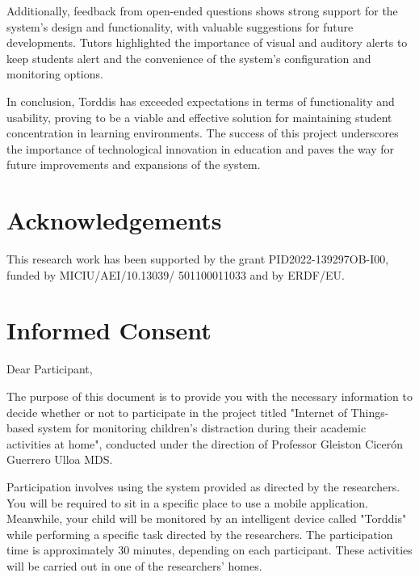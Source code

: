 \documentclass[a4paper,fleqn]{cas-sc}
\begin{document}
		Additionally, feedback from open-ended questions shows strong support for the system's design and functionality, with valuable suggestions for future developments. Tutors highlighted the importance of visual and auditory alerts to keep students alert and the convenience of the system's configuration and monitoring options.
		
		In conclusion, Torddis has exceeded expectations in terms of functionality and usability, proving to be a viable and effective solution for maintaining student concentration in learning environments. The success of this project underscores the importance of technological innovation in education and paves the way for future improvements and expansions of the system.

	\section*{Acknowledgements}
	
	This research work has been supported by the grant PID2022-139297OB-I00, funded by MICIU/AEI/10.13039/ 501100011033 and by ERDF/EU.

	\printcredits
	
	

	
	
	\clearpage
	
	\appendix
	\section{Informed Consent} \label{Appendix:InformedConsent}
	Dear Participant,
	
	The purpose of this document is to provide you with the necessary information to decide whether or not to participate in the project titled "Internet of Things-based system for monitoring children's distraction during their academic activities at home", conducted under the direction of Professor Gleiston Cicerón Guerrero Ulloa MDS.
	
	Participation involves using the system provided as directed by the researchers. You will be required to sit in a specific place to use a mobile application. Meanwhile, your child will be monitored by an intelligent device called "Torddis" while performing a specific task directed by the researchers. The participation time is approximately 30 minutes, depending on each participant. These activities will be carried out in one of the researchers' homes.
	
\end{document}
